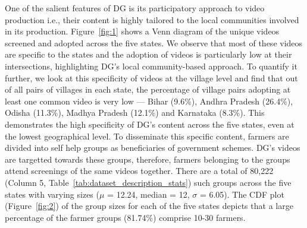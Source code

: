 \documentclass[manuscript,screen]{acmart}
\begin{document}
One of the salient features of DG is its participatory approach to video production i.e., their content is highly tailored to the local communities involved in its production. Figure~\ref{fig:1} shows a Venn diagram of the unique videos screened and adopted across the five states. We observe that most of these videos are specific to the states and the adoption of videos is particularly low at their intersections, highlighting DG's local community-based approach. To quantify it further, we look at this specificity of videos at the village level and find that out of all pairs of villages in each state, the percentage of village pairs adopting at least one common video is very low --- Bihar (9.6\%), Andhra Pradesh (26.4\%), Odisha (11.3\%), Madhya Pradesh (12.1\%) and Karnataka (8.3\%). This demonstrates the high specificity of DG’s content across the five states, even at the lowest geographical level. To disseminate this specific content, farmers are divided into self help groups as beneficiaries of government schemes. DG's videos are targetted towards these groups, therefore, farmers belonging to the groups attend screenings of the same videos together. There are a total of 80,222 (Column 5, Table~\ref{tab:dataset_description_stats}) such groups across the five states with varying sizes ($\mu$ = 12.24, median = 12, $\sigma$ = 6.05). The CDF plot (Figure~\ref{fig:2}) of the group sizes for each of the five states depicts that a large percentage of the farmer groups (81.74\%) comprise 10-30 farmers. 

\end{document}
